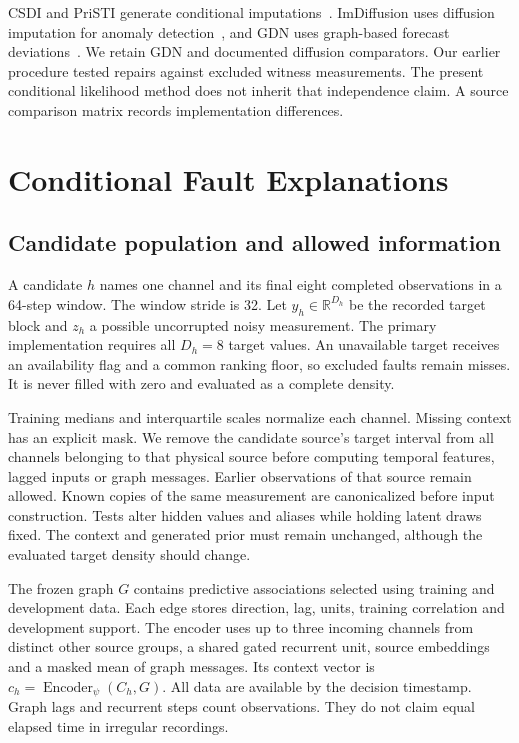 \documentclass[conference]{IEEEtran}
\newcommand{\1}{\mathbf{1}}
\begin{document}
CSDI and PriSTI generate conditional imputations~\cite{csdi,pristi}. ImDiffusion uses diffusion imputation for anomaly detection~\cite{imdiffusion}, and GDN uses graph-based forecast deviations~\cite{gdn}. We retain GDN and documented diffusion comparators. Our earlier procedure tested repairs against excluded witness measurements. The present conditional likelihood method does not inherit that independence claim. A source comparison matrix records implementation differences.

\section{Conditional Fault Explanations}
\subsection{Candidate population and allowed information}
A candidate $h$ names one channel and its final eight completed observations in a 64-step window. The window stride is 32. Let $y_h\in\mathbb R^{D_h}$ be the recorded target block and $z_h$ a possible uncorrupted noisy measurement. The primary implementation requires all $D_h=8$ target values. An unavailable target receives an availability flag and a common ranking floor, so excluded faults remain misses. It is never filled with zero and evaluated as a complete density.

Training medians and interquartile scales normalize each channel. Missing context has an explicit mask. We remove the candidate source's target interval from all channels belonging to that physical source before computing temporal features, lagged inputs or graph messages. Earlier observations of that source remain allowed. Known copies of the same measurement are canonicalized before input construction. Tests alter hidden values and aliases while holding latent draws fixed. The context and generated prior must remain unchanged, although the evaluated target density should change.

The frozen graph $G$ contains predictive associations selected using training and development data. Each edge stores direction, lag, units, training correlation and development support. The encoder uses up to three incoming channels from distinct other source groups, a shared gated recurrent unit, source embeddings and a masked mean of graph messages. Its context vector is $c_h=\operatorname{Encoder}_{\psi}(C_h,G)$. All data are available by the decision timestamp. Graph lags and recurrent steps count observations. They do not claim equal elapsed time in irregular recordings.
\end{document}
